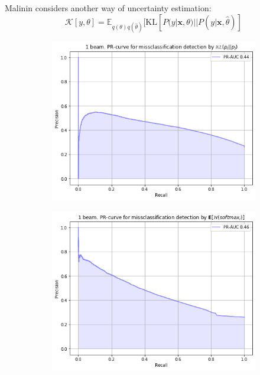 \documentclass[a4paper,14pt]{extarticle}
\begin{document}
	Malinin considers another way of uncertainty estimation:
	\begin{equation*}
		\mathcal{K}[y, \theta] = \mathbb{E}_{q(\theta)q(\hat{\theta})}[
			\mathrm{KL}[P(y|\textbf{x}, \theta) || P(y|\textbf{x}, \hat{\theta})
		]
	\end{equation*}
	
	\begin{figure}[t]
		\begin{subfigure}{.45\textwidth}
			\includegraphics[width=\textwidth]{images/malinin_in_kl.png}
		\end{subfigure}
		\begin{subfigure}{.45\textwidth}
			\includegraphics[width=\textwidth]{images/malinin_in_du.png}
		\end{subfigure}
	\end{figure}
\end{document}
